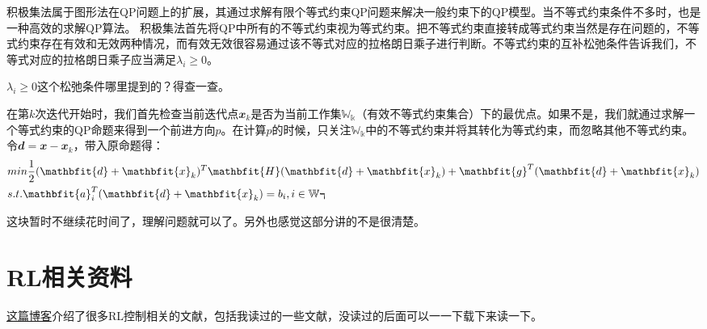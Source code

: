 积极集法属于图形法在QP问题上的扩展，其通过求解有限个等式约束QP问题来解决一般约束下的QP模型。当不等式约束条件不多时，也是一种高效的求解QP算法。
积极集法首先将QP中所有的不等式约束视为等式约束。把不等式约束直接转成等式约束当然是存在问题的，不等式约束存在有效和无效两种情况，而有效无效很容易通过该不等式对应的拉格朗日乘子进行判断。不等式约束的互补松弛条件告诉我们，不等式对应的拉格朗日乘子应当满足$\lambda_i\geq 0$。
\begin{note}
  $\lambda_i\geq 0$这个松弛条件哪里提到的？得查一查。
\end{note}

在第$k$次迭代开始时，我们首先检查当前迭代点$\mathbfit{x}_k$是否为当前工作集$\mathbb{W_k}$（有效不等式约束集合）下的最优点。如果不是，我们就通过求解一个等式约束的QP命题来得到一个前进方向$p$。在计算$p$的时候，只关注$\mathbb{W_k}$中的不等式约束并将其转化为等式约束，而忽略其他不等式约束。令$\mathbfit{d}=\mathbfit{x}-\mathbfit{x}_k$，带入原命题得：
\begin{align}
  &min \quad \frac{1}{2}(\mathbfit{d}+\mathbfit{x}_k)^T\mathbfit{H}(\mathbfit{d}+\mathbfit{x}_k)+\mathbfit{g}^T(\mathbfit{d}+\mathbfit{x}_k) \notag\\
  &s.t. \quad \mathbfit{a}_i^T(\mathbfit{d}+\mathbfit{x}_k)=b_i, \quad i \in \mathbb{W_k}
\end{align}

\begin{note}
  这块暂时不继续花时间了，理解问题就可以了。另外也感觉这部分讲的不是很清楚。
\end{note}

\section[RL相关资料]{RL相关资料}
\href{https://zhuanlan.zhihu.com/p/570352241}{这篇博客}介绍了很多RL控制相关的文献，包括我读过的一些文献，没读过的后面可以一一下载下来读一下。


